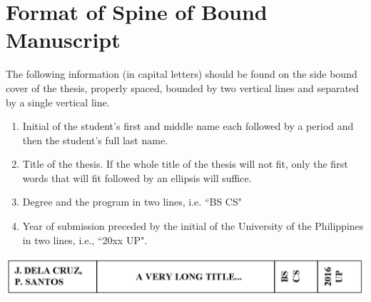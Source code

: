 \section{Format of Spine of Bound Manuscript}
\label{sec:side}
The following information (in capital letters) should be found on the side bound cover of the thesis, properly spaced, bounded by two vertical lines and separated by a single vertical line.
\begin{enumerate}
\item Initial of the student's first and middle name each followed by a period and then the student's full last name.
\item Title of the thesis. If the whole title of the thesis will not fit, only the first words that will fit followed by an ellipsis will suffice.
\item Degree and the program in two lines, i.e. ``BS CS" 
\item Year of submission preceded by the initial of the University of the Philippines in two lines, i.e., ``20xx UP".
\end{enumerate}

\begin{center}
	\includegraphics[width=\textwidth]{spine.png}
\end{center}